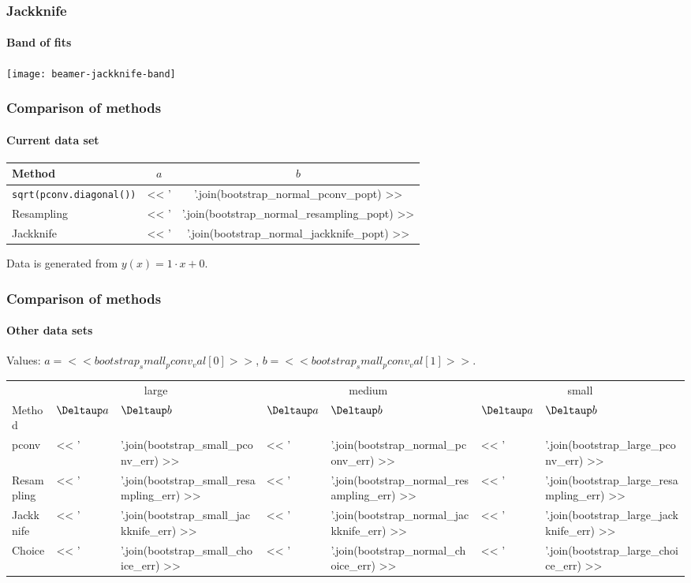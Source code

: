 \documentclass[english, fleqn]{beamer}
\begin{document}
\begin{frame}
    \frametitle{Jackknife}
    \framesubtitle{Band of fits}
    \centering
    \texttt{[image: beamer-jackknife-band]}
\end{frame}

\begin{frame}
    \frametitle{Comparison of methods}
    \framesubtitle{Current data set}
    {
        \centering
        \begin{tabular}{lSS}
            \toprule
            {Method}
            & {$a$}
            & {$b$}
            \\
            \midrule
            \texttt{sqrt(pconv.diagonal())} & << ' & '.join(bootstrap_normal_pconv_popt) >> \\
            Resampling & << ' & '.join(bootstrap_normal_resampling_popt) >> \\
            Jackknife & << ' & '.join(bootstrap_normal_jackknife_popt) >> \\
            \bottomrule
        \end{tabular}
    }

    \pause

    Data is generated from $y(x) = 1 \cdot x + 0$.

\end{frame}

\begin{frame}
    \frametitle{Comparison of methods}
    \framesubtitle{Other data sets}

    Values: $a = << bootstrap_small_pconv_val[0] >>$, $b = <<
    bootstrap_small_pconv_val[1] >>$.

    \begin{tabular}{l*6l}
        \toprule
        & \multicolumn{2}{c}{large}
        & \multicolumn{2}{c}{medium}
        & \multicolumn{2}{c}{small}
        \\
        \cmidrule(rl){2-3}
        \cmidrule(rl){4-5}
        \cmidrule(l){6-7}
        Method
        & $\Deltaup a$
        & $\Deltaup b$
        & $\Deltaup a$
        & $\Deltaup b$
        & $\Deltaup a$
        & $\Deltaup b$ \\
        \midrule
        pconv
        & << ' & '.join(bootstrap_small_pconv_err) >>
        & << ' & '.join(bootstrap_normal_pconv_err) >>
        & << ' & '.join(bootstrap_large_pconv_err) >> \\
        Resampling
        & << ' & '.join(bootstrap_small_resampling_err) >>
        & << ' & '.join(bootstrap_normal_resampling_err) >>
        & << ' & '.join(bootstrap_large_resampling_err) >> \\
        Jackknife
        & << ' & '.join(bootstrap_small_jackknife_err) >>
        & << ' & '.join(bootstrap_normal_jackknife_err) >>
        & << ' & '.join(bootstrap_large_jackknife_err) >> \\
        Choice
        & << ' & '.join(bootstrap_small_choice_err) >>
        & << ' & '.join(bootstrap_normal_choice_err) >>
        & << ' & '.join(bootstrap_large_choice_err) >> \\
        \bottomrule
    \end{tabular}
\end{frame}
\end{document}
